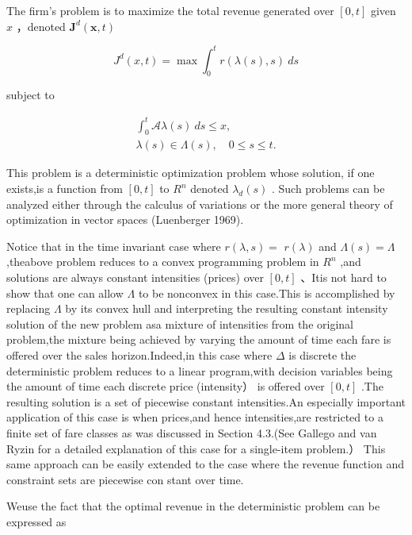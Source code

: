 The firm's problem is to maximize the total revenue generated over
\([ 0 , t ]\) given \(x\) ，denoted
\(\boldsymbol { J } ^ { d } ( \boldsymbol { x } , t )\)

\[
J ^ { d } ( x , t ) = \operatorname* { m a x } \int _ { 0 } ^ { t } r ( \lambda ( s ) , s ) \ d s
\]

subject to

\[
\begin{array} { l } { \displaystyle \int _ { 0 } ^ { t } { \mathcal A } \lambda ( s ) ~ d s \leqslant x , } \\ { \lambda ( s ) \in \Lambda ( s ) , \quad 0 \leqslant s \leqslant t . } \end{array}
\]

This problem is a deterministic optimization problem whose solution, if
one exists,is a function from \([ 0 , t ]\) to \(R ^ { n }\) denoted
\(\lambda _ { d } ( s )\) . Such problems can be analyzed either through
the calculus of variations or the more general theory of optimization in
vector spaces (Luenberger 1969).

Notice that in the time invariant case where \(r ( \lambda , s ) =\)
\(r ( \lambda )\) and \(\Lambda ( s ) = \Lambda\) ,theabove problem
reduces to a convex programming problem in \(R ^ { n }\) ,and solutions
are always constant intensities (prices) over \([ 0 , t ]\) 、Itis not
hard to show that one can allow \(\Lambda\) to be nonconvex in this
case.This is accomplished by replacing \(\Lambda\) by its convex hull
and interpreting the resulting constant intensity solution of the new
problem asa mixture of intensities from the original problem,the mixture
being achieved by varying the amount of time each fare is offered over
the sales horizon.Indeed,in this case where \(\Delta\) is discrete the
deterministic problem reduces to a linear program,with decision
variables being the amount of time each discrete price (intensity） is
offered over \([ 0 , t ]\) .The resulting solution is a set of piecewise
constant intensities.An especially important application of this case is
when prices,and hence intensities,are restricted to a finite set of fare
classes as was discussed in Section 4.3.(See Gallego and van Ryzin for a
detailed explanation of this case for a single-item problem.） This same
approach can be easily extended to the case where the revenue function
and constraint sets are piecewise con stant over time.

Weuse the fact that the optimal revenue in the deterministic problem can
be expressed as

